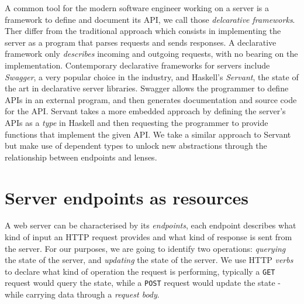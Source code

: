 \documentclass[sigplan,screen,review, nonacm]{acmart}
\begin{document}
A common tool for the modern software engineer working on a server is
a framework to define and document its API, we call those
\emph{delcarative frameworks}. Ther differ
from the traditional approach which consists in implementing the server
as a program that parses requests and sends responses. A declarative framework
only \emph{describes} incoming and outgoing requests, with no
bearing on the implementation.
Contemporary declarative frameworks for servers include \emph{Swagger}\cite{swagger}, a very
popular choice in the industry, and Haskell's \emph{Servant}\cite{servant}, the state of the
art in declarative server libraries. Swagger allows the programmer to define
APIs in an external program, and then generates documentation and source code for the API. Servant
takes a more embedded approach by defining the server's APIs as a \emph{type} in Haskell and then
requesting the programmer to provide functions that implement the given API.
We take a similar approach to Servant but make use of dependent types to unlock
new abstractions through the relationship between endpoints and lenses.

\hypertarget{server-endpoints-as-resources}{%
\section{Server endpoints as
resources}\label{server-endpoints-as-resources}}

A web server can be characterised by its \emph{endpoints}, each endpoint
describes what kind of input an HTTP\cite{http} request provides and what kind of
response is sent from the server. For our purposes, we are going to
identify two operations: \emph{querying} the state of the server, and \emph{updating}
the state of the server. We use HTTP \emph{verbs} to
declare what kind of operation the request is performing, typically a
\texttt{GET} request would query the state, while a \texttt{POST}
request would update the state - while carrying data through a
 \emph{request body}.
\end{document}
